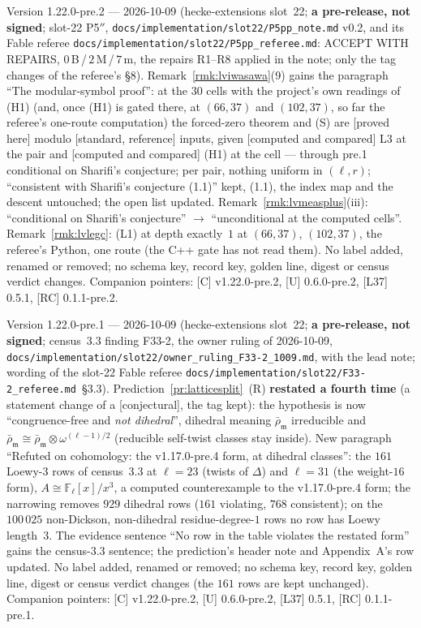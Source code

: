 \documentclass[11pt]{article}
\theoremstyle{remark}
\newcommand{\F}{\mathbb{F}}
\newcommand{\Fl}{\F_\ell}
\newcommand{\m}{\mathfrak{m}}
\newcommand{\PROVED}{\textsf{[proved here]}}
\newcommand{\STD}{\textsf{[standard, reference]}}
\newcommand{\CONJ}{\textsf{[conjectural]}}
\newcommand{\CMPD}{\textsf{[computed and compared]}}   %
\begin{document}
Version 1.22.0-pre.2 --- 2026-10-09 (hecke-extensions slot~22; \textbf{a pre-release, not signed}; slot-22 P5$''$, \texttt{docs/implementation/slot22/P5pp\_note.md} v0.2, and its Fable referee
\texttt{docs/implementation/slot22/P5pp\_referee.md}: ACCEPT WITH REPAIRS, $0$\,B\,/\,$2$\,M\,/\,$7$\,m, the repairs R1--R8 applied in the note; only the tag changes of the referee's \S8).
Remark~\ref{rmk:lviwasawa}(9) gains the paragraph ``The modular-symbol proof'': at the $30$ cells with the project's own readings of (H1) (and, once (H1) is gated there, at $(66,37)$ and $(102,37)$, so far the referee's one-route computation)
the forced-zero theorem and (S) are \PROVED{} modulo \STD{} inputs, given \CMPD{} L3 at the pair and \CMPD{} (H1) at the cell --- through pre.1 conditional on Sharifi's conjecture; per pair, nothing uniform in $(\ell,r)$;
``consistent with Sharifi's conjecture (1.1)'' kept, (1.1), the index map and the descent untouched; the open list updated. Remark~\ref{rmk:lvmeasplus}(iii): ``conditional on Sharifi's conjecture'' $\to$ ``unconditional at the
computed cells''. Remark~\ref{rmk:lvlegc}: (L1) at depth exactly~$1$ at $(66,37)$, $(102,37)$, the referee's Python, one route (the C++ gate has not read them). No label added, renamed or removed; no schema key,
record key, golden line, digest or census verdict changes. Companion pointers: [C] v1.22.0-pre.2, [U] 0.6.0-pre.2, [L37] 0.5.1, [RC] 0.1.1-pre.2.

Version 1.22.0-pre.1 --- 2026-10-09 (hecke-extensions slot~22; \textbf{a pre-release, not signed}; census~3.3 finding F33-2, the owner ruling of 2026-10-09,
\texttt{docs/implementation/slot22/owner\_ruling\_F33-2\_1009.md}, with the lead note; wording of the slot-22 Fable referee \texttt{docs/implementation/slot22/F33-2\_referee.md}~\S3.3).
Prediction~\ref{pr:latticesplit}~(R) \textbf{restated a fourth time} (a statement change of a \CONJ, the tag kept): the hypothesis is now ``congruence-free and \emph{not dihedral}'',
dihedral meaning $\bar\rho_\m$ irreducible and $\bar\rho_\m\cong\bar\rho_\m\otimes\omega^{(\ell-1)/2}$ (reducible self-twist classes stay inside). New paragraph ``Refuted on cohomology: the
v1.17.0-pre.4 form, at dihedral classes'': the $161$ Loewy-$3$ rows of census~3.3 at $\ell=23$ (twists of $\Delta$) and $\ell=31$ (the weight-$16$ form), $A\cong\Fl[x]/x^3$, a computed
counterexample to the v1.17.0-pre.4 form; the narrowing removes $929$ dihedral rows ($161$ violating, $768$ consistent); on the $100\,025$ non-Dickson, non-dihedral residue-degree-$1$ rows no
row has Loewy length~$3$. The evidence sentence ``No row in the table violates the restated form'' gains the census-3.3 sentence; the prediction's header note and Appendix~A's row updated.
No label added, renamed or removed; no schema key, record key, golden line, digest or census verdict changes (the $161$ rows are kept unchanged). Companion pointers: [C] v1.22.0-pre.2, [U] 0.6.0-pre.2, [L37] 0.5.1, [RC] 0.1.1-pre.1.
\end{document}
